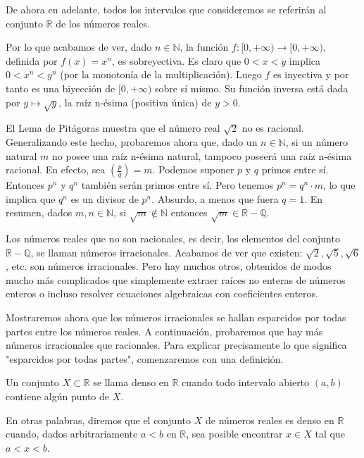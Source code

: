 \documentclass[12pt,oneside]{book}
\begin{document}
De ahora en adelante, todos los intervalos que consideremos se referirán al conjunto \(\mathbb{R}\) de los números reales.

Por lo que acabamos de ver, dado \(n \in \mathbb{N}\), la función \(f: [0, +\infty) \to [0, +\infty)\), definida por \(f(x) = x^n\), es sobreyectiva. Es claro que \(0 < x < y\) implica \(0 < x^n < y^n\) (por la monotonía de la multiplicación). Luego \(f\) es inyectiva y por tanto es una biyección de \([0, +\infty)\) sobre sí mismo. Su función inversa está dada por \( y \mapsto \sqrt{y} \), la raíz n-ésima (positiva única) de \( y > 0 \).

El Lema de Pitágoras muestra que el número real \( \sqrt{2} \) no es racional. Generalizando este hecho, probaremos ahora que, dado un \( n \in \mathbb{N} \), si un número natural \( m \) no posee una raíz n-ésima natural, tampoco poseerá una raíz n-ésima racional. En efecto, sea \( \left( \frac{p}{q} \right) = m \). Podemos suponer \( p \) y \( q \) primos entre sí. Entonces \( p^n \) y \( q^n \) también serán primos entre sí. Pero tenemos \( p^n = q^n \cdot m \), lo que implica que \( q^n \) es un divisor de \( p^n \). Absurdo, a menos que fuera \( q = 1 \). En resumen, dados \( m, n \in \mathbb{N} \), si \( \sqrt{m} \notin \mathbb{N} \) entonces \( \sqrt{m} \in \mathbb{R} - \mathbb{Q} \).

Los números reales que no son racionales, es decir, los elementos del conjunto \( \mathbb{R} - \mathbb{Q} \), se llaman números irracionales. Acabamos de ver que existen: \( \sqrt{2}, \sqrt{5}, \sqrt{6} \), etc. son números irracionales. Pero hay muchos otros, obtenidos de modos mucho más complicados que simplemente extraer raíces no enteras de números enteros o incluso resolver ecuaciones algebraicas con coeficientes enteros.

Mostraremos ahora que los números irracionales se hallan esparcidos por todas partes entre los números reales. A continuación, probaremos que hay más números irracionales que racionales. Para explicar precisamente lo que significa "esparcidos por todas partes", comenzaremos con una definición.

Un conjunto \( X \subset \mathbb{R} \) se llama denso en \( \mathbb{R} \) cuando todo intervalo abierto \( (a, b) \) contiene algún punto de \( X \).

En otras palabras, diremos que el conjunto \( X \) de números reales es denso en \( \mathbb{R} \) cuando, dados arbitrariamente \( a < b \) en \( \mathbb{R} \), sea posible encontrar \( x \in X \) tal que \( a < x < b \).
\end{document}
